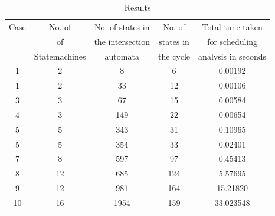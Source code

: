 \begin{table}[ht]
\caption{Results}
\centering
\begin{tabular}{|c | c | c | c | c |}
\hline %
Case & No. of           &  No. of states in   & No. of      & Total time taken          \\       
     & of               &  the intersection   & states in   & for scheduling            \\  
     & Statemachines    &  automata           & the cycle   & analysis in seconds   \\
\hline
\hline
1 & 2 & 8 & 6 & 0.00192\\

1 & 2  & 33 & 12 &  0.00106 \\

3 & 3  & 67 & 15 & 0.00584 \\

4 & 3 & 149 & 22 & 0.00654 \\

5 & 5 & 343 & 31 & 0.10965 \\

5 & 5 & 354 & 33 & 0.02401 \\

7 & 8 & 597 & 97 & 0.45413\\

8 & 12 & 685 & 124 & 5.57695\\

9 & 12 & 981 & 164 & 15.21820 \\

10 & 16 & 1954 & 159 & 33.023548\\


\hline

\end{tabular}
\label{table:nonlin}

\end{table}

